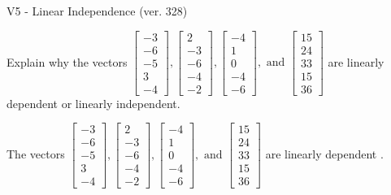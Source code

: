 \begin{exercise}
  \begin{exerciseTitle}V5 - Linear Independence (ver. 328)\end{exerciseTitle}
  \begin{exerciseStatement}
    Explain why the vectors \(\left[\begin{array}{r}
-3 \\
-6 \\
-5 \\
3 \\
-4
\end{array}\right] , \left[\begin{array}{r}
2 \\
-3 \\
-6 \\
-4 \\
-2
\end{array}\right] , \left[\begin{array}{r}
-4 \\
1 \\
0 \\
-4 \\
-6
\end{array}\right] , \text{ and } \left[\begin{array}{r}
15 \\
24 \\
33 \\
15 \\
36
\end{array}\right]\) are linearly dependent or linearly independent.	


  \end{exerciseStatement}
  \begin{exerciseAnswer}
   The vectors \(\left[\begin{array}{r}
-3 \\
-6 \\
-5 \\
3 \\
-4
\end{array}\right] , \left[\begin{array}{r}
2 \\
-3 \\
-6 \\
-4 \\
-2
\end{array}\right] , \left[\begin{array}{r}
-4 \\
1 \\
0 \\
-4 \\
-6
\end{array}\right] , \text{ and } \left[\begin{array}{r}
15 \\
24 \\
33 \\
15 \\
36
\end{array}\right]\) are 
  	 linearly dependent  .
  


  \end{exerciseAnswer}
\end{exercise}